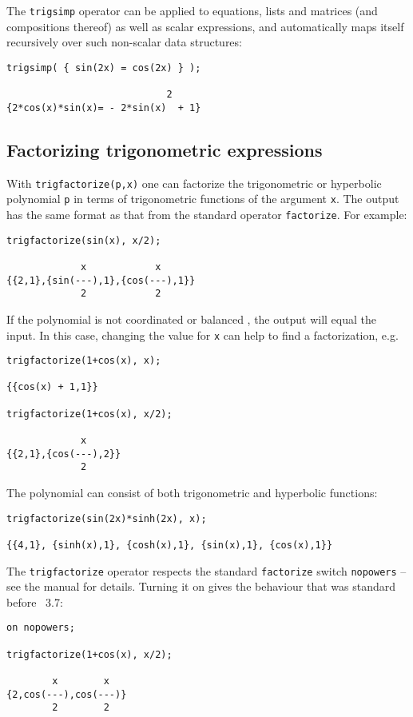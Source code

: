 The \texttt{trigsimp} operator can be applied to equations, lists and
matrices (and compositions thereof) as well as scalar expressions, and
automatically maps itself recursively over such non-scalar data
structures:
\begin{verbatim}
trigsimp( { sin(2x) = cos(2x) } );

                            2
{2*cos(x)*sin(x)= - 2*sin(x)  + 1}
\end{verbatim}


\subsection{Factorizing trigonometric expressions}
\hypertarget{operator:TRIGFACTORIZE}{}

With \texttt{trigfactorize(p,x)} one can factorize the trigonometric
or hyperbolic polynomial \texttt{p} in terms of trigonometric
functions of the argument \texttt{x}.  The output has the same format
as that from the standard \REDUCE{} operator \texttt{factorize}.  For
example:
\begin{verbatim}
trigfactorize(sin(x), x/2);

             x            x
{{2,1},{sin(---),1},{cos(---),1}}
             2            2
\end{verbatim}
If the polynomial is not coordinated or balanced \cite{Roach:Talk}, the
output will equal the input.  In this case, changing the value for
\texttt{x} can help to find a factorization, e.g.
\begin{verbatim}
trigfactorize(1+cos(x), x);

{{cos(x) + 1,1}}

trigfactorize(1+cos(x), x/2);

             x
{{2,1},{cos(---),2}}
             2
\end{verbatim}
The polynomial can consist of both trigonometric and hyperbolic functions:
\begin{verbatim}
trigfactorize(sin(2x)*sinh(2x), x);

{{4,1}, {sinh(x),1}, {cosh(x),1}, {sin(x),1}, {cos(x),1}}
\end{verbatim}

The \texttt{trigfactorize} operator respects the standard \REDUCE{}
\texttt{factorize} switch \texttt{nopowers} -- see the \REDUCE{}
manual for details.  Turning it on gives the behaviour that was
standard before \REDUCE~3.7:
\begin{verbatim}
on nopowers;

trigfactorize(1+cos(x), x/2);

        x        x
{2,cos(---),cos(---)}
        2        2
\end{verbatim}


